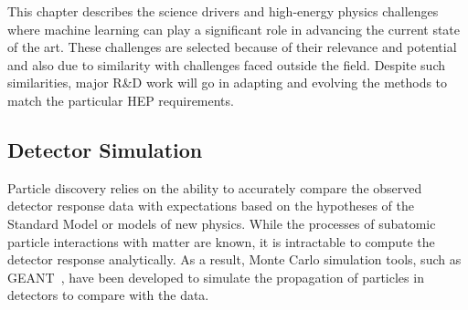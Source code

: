 

This chapter describes the science drivers and high-energy physics challenges where machine learning can play a significant role in advancing the current state of the art.
These challenges are selected because of their relevance and potential and also due to similarity with challenges faced outside the field.
Despite such similarities, major R\&D work will go in adapting and evolving the methods to match the particular HEP requirements.


\subsection{Detector Simulation}
\label{sec:fast-simulation}

Particle discovery relies on the ability to accurately compare the observed detector response data with expectations based on the hypotheses of the Standard Model or models of new physics.
While the processes of subatomic particle interactions with matter are known, it is intractable to compute the detector response analytically. As a result, Monte Carlo simulation tools, such as GEANT~\cite{GEANT4}, have been developed to simulate the propagation of particles in detectors to compare with the data.\medskip



